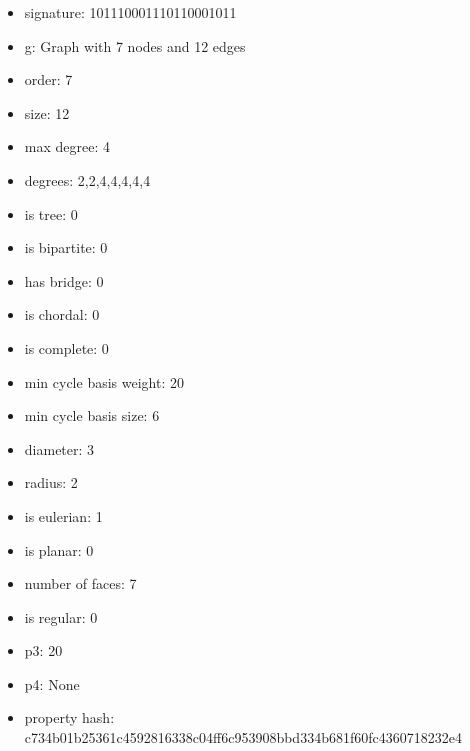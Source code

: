 \begin{itemize}
\item signature: 101110001110110001011
\item g: Graph with 7 nodes and 12 edges
\item order: 7
\item size: 12
\item max degree: 4
\item degrees: 2,2,4,4,4,4,4
\item is tree: 0
\item is bipartite: 0
\item has bridge: 0
\item is chordal: 0
\item is complete: 0
\item min cycle basis weight: 20
\item min cycle basis size: 6
\item diameter: 3
\item radius: 2
\item is eulerian: 1
\item is planar: 0
\item number of faces: 7
\item is regular: 0
\item p3: 20
\item p4: None
\item property hash: c734b01b25361c4592816338c04ff6c953908bbd334b681f60fc4360718232e4
\end{itemize}
\newpage
\begin{figure}
\end{figure}
